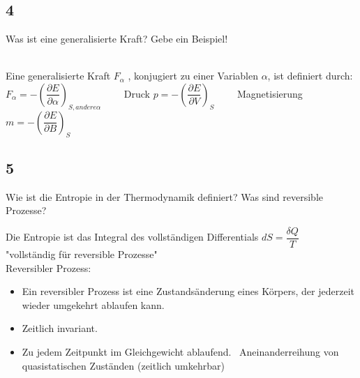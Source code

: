 \documentclass[12pt,a4paper]{report}
\newenvironment{myfrag}{\begin{it}}{\end{it}\vspace{3mm}\par}
\numberwithin{equation}{section}
\begin{document}
\subsection{4}
\begin{myfrag}
Was ist eine generalisierte Kraft? Gebe ein Beispiel!
\end{myfrag} \quad \\
Eine generalisierte Kraft $F_\alpha$ , konjugiert zu einer Variablen $\alpha$, ist definiert durch: \\[2ex]
$F_\alpha = - \left( \dfrac{\partial E}{\partial \alpha} \right) _{S,andere \alpha}\qquad $ Druck
$p = -\left(\dfrac{\partial E}{\partial V} \right) _S \qquad
$ Magnetisierung
$m= -\left(\dfrac{\partial E}{\partial B} \right) _S $
\subsection{5}
\begin{myfrag}
Wie ist die Entropie in der Thermodynamik definiert? Was sind
reversible Prozesse?
\end{myfrag}
Die Entropie ist das Integral des vollständigen Differentials $dS = \dfrac{\delta Q}{T}$ \\"vollständig für reversible Prozesse" \\[2ex]
Reversibler Prozess:
\begin{itemize}
\item Ein reversibler Prozess ist eine Zustandsänderung eines Körpers, der jederzeit wieder umgekehrt ablaufen kann.
\item Zeitlich invariant. 
\item Zu jedem Zeitpunkt im Gleichgewicht ablaufend.
\ Aneinanderreihung von quasistatischen Zuständen (zeitlich umkehrbar)
\end{itemize} 
\end{document}
